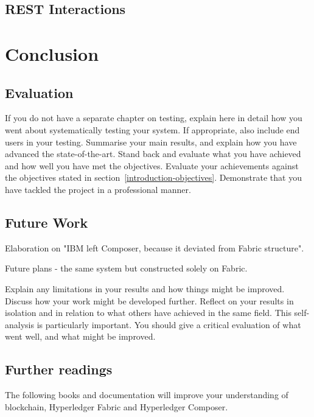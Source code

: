 \documentclass[a4paper,11pt]{report}
\begin{document}
\section{REST Interactions}


\chapter{Conclusion}

\label{conclusion}

\section{Evaluation}

\label{conclusion-evaluation}

If you do not have a separate chapter on testing, explain here in detail how you
went about systematically testing your system. If appropriate, also include
end users in your testing. Summarise your main results, and explain how you have
advanced the state-of-the-art. Stand back and evaluate what you have achieved
and how well you have met the objectives. Evaluate your achievements against the
objectives stated in section~\ref{introduction-objectives}. Demonstrate that you
have tackled the project in a professional manner.

\section{Future Work}

\label{conclusion-future}

Elaboration on "IBM left Composer, because it deviated from Fabric structure".

Future plans - the same system but constructed solely on Fabric.	


Explain any limitations in your results and how things might be improved.
Discuss how your work might be developed further. Reflect on your results in
isolation and in relation to what others have achieved in the same field. This
self-analysis is particularly important. You should give a critical evaluation
of what went well, and what might be improved.

\section{Further readings}
The following books and documentation will improve your understanding of blockchain, Hyperledger Fabric and Hyperledger Composer.
\end{document}

